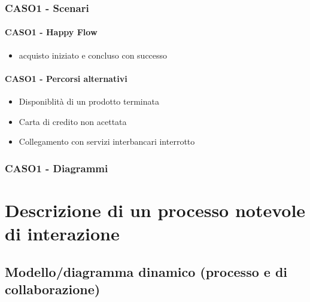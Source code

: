 \documentclass[12pt,a4paper,oneside]{article} %
\begin{document}
\subsubsection{CASO1 - Scenari}
\paragraph{CASO1 - Happy Flow}
	\begin{itemize}
	\item acquisto iniziato e concluso con successo
	\end{itemize}
\paragraph{CASO1 - Percorsi alternativi}
	\begin{itemize}
	\item Disponiblità di un prodotto terminata
	\item Carta di credito non acettata
	\item Collegamento con servizi interbancari interrotto
	\end{itemize}
\subsubsection{CASO1 - Diagrammi}

\newpage %


\section{Descrizione di un processo notevole di interazione}

\subsection{Modello/diagramma dinamico (processo e di collaborazione)}

\newpage %

\end{document}
